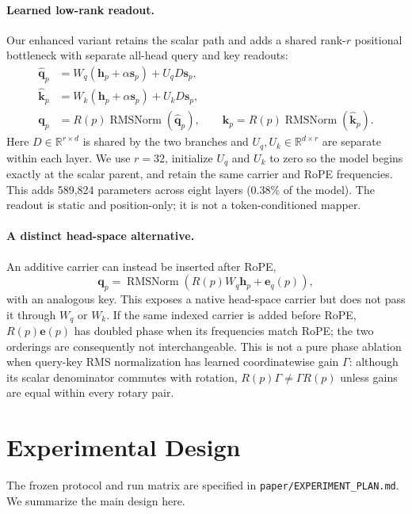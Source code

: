 \documentclass{article}
\newcommand{\RMSNorm}{\operatorname{RMSNorm}}
\begin{document}
\paragraph{Learned low-rank readout.}
Our enhanced variant retains the scalar path and adds a shared rank-$r$
positional bottleneck with separate all-head query and key readouts:
\begin{align}
    \widehat{\mathbf q}_p
      &= W_q(\mathbf h_p+\alpha\mathbf s_p)+U_qD\mathbf s_p, \\
    \widehat{\mathbf k}_p
      &= W_k(\mathbf h_p+\alpha\mathbf s_p)+U_kD\mathbf s_p, \\
    \mathbf q_p&=R(p)\RMSNorm(\widehat{\mathbf q}_p),\qquad
    \mathbf k_p=R(p)\RMSNorm(\widehat{\mathbf k}_p).
    \label{eq:rankreadout}
\end{align}
Here $D\in\mathbb R^{r\times d}$ is shared by the two branches and
$U_q,U_k\in\mathbb R^{d\times r}$ are separate within each layer. We use
$r=32$, initialize $U_q$ and $U_k$ to zero so the model begins exactly at the
scalar parent, and retain the same carrier and RoPE frequencies. This adds
589,824 parameters across eight layers (0.38\% of the model). The readout is
static and position-only; it is not a token-conditioned mapper.

\paragraph{A distinct head-space alternative.}
An additive carrier can instead be inserted after RoPE,
\begin{equation}
  \mathbf{q}_p=\RMSNorm\!\left(R(p)W_q\mathbf{h}_p+
  \mathbf{e}_q(p)\right),
  \label{eq:postrope}
\end{equation}
with an analogous key. This exposes a native head-space carrier but does not
pass it through $W_q$ or $W_k$. If the same indexed carrier is added before
RoPE, $R(p)\mathbf{e}(p)$ has doubled phase when its frequencies match RoPE;
the two orderings are consequently not interchangeable. This is not a pure
phase ablation when query-key RMS normalization has learned coordinatewise
gain $\Gamma$: although its scalar denominator commutes with rotation,
$R(p)\Gamma\neq\Gamma R(p)$ unless gains are equal within every rotary pair.

\section{Experimental Design}

The frozen protocol and run matrix are specified in
\texttt{paper/EXPERIMENT\_PLAN.md}. We summarize the main design here.
\end{document}
